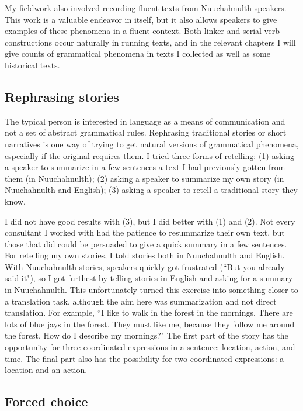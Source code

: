 My fieldwork also involved recording fluent texts from Nuuchahnulth speakers. This work is a valuable endeavor in itself, but it also allows speakers to give examples of these phenomena in a fluent context. Both linker and serial verb constructions occur naturally in running texts, and in the relevant chapters I will give counts of grammatical phenomena in texts I collected as well as some historical texts.

\subsection{Rephrasing stories}

The typical person is interested in language as a means of communication and not a set of abstract grammatical rules. Rephrasing traditional stories or short narratives is one way of trying to get natural versions of grammatical phenomena, especially if the original requires them. I tried three forms of retelling: (1) asking a speaker to summarize in a few sentences a text I had previously gotten from them (in Nuuchahnulth); (2) asking a speaker to summarize my own story (in Nuuchahnulth and English); (3) asking a speaker to retell a traditional story they know.

I did not have good results with (3), but I did better with (1) and (2). Not every consultant I worked with had the patience to resummarize their own text, but those that did could be persuaded to give a quick summary in a few sentences. For retelling my own stories, I told stories both in Nuuchahnulth and English. With Nuuchahnulth stories, speakers quickly got frustrated (``But you already said it"), so I got furthest by telling stories in English and asking for a summary in Nuuchahnulth. This unfortunately turned this exercise into something closer to a translation task, although the aim here was summarization and not direct translation. For example, ``I like to walk in the forest in the mornings. There are lots of blue jays in the forest. They must like me, because they follow me around the forest. How do I describe my mornings?" The first part of the story has the opportunity for three coordinated expressions in a sentence: location, action, and time. The final part also has the possibility for two coordinated expressions: a location and an action. 

\subsection{Forced choice}

